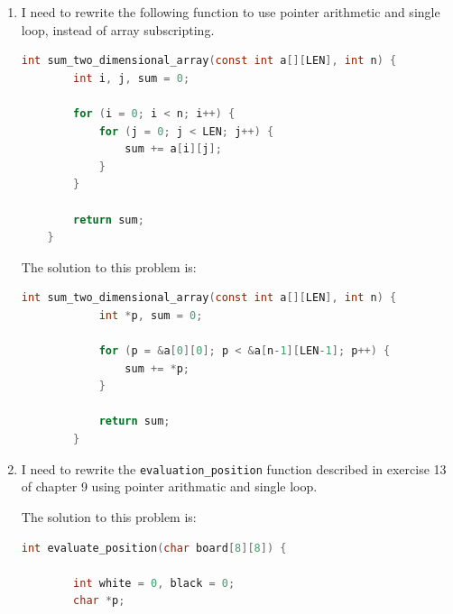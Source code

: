 \documentclass[12pt]{article}
\begin{document}
\begin{enumerate}[1.]
\begin{lstlisting}[language=c]
\end{lstlisting}

    \item

    I need to rewrite the following function to use pointer arithmetic
    and single loop, instead of array subscripting.

    \bigskip

\begin{lstlisting}[language=c]
    int sum_two_dimensional_array(const int a[][LEN], int n) {
        int i, j, sum = 0;

        for (i = 0; i < n; i++) {
            for (j = 0; j < LEN; j++) {
                sum += a[i][j];
            }
        }

        return sum;
    }

\end{lstlisting}

    \bigskip

    The solution to this problem is:

    \bigskip


    \begin{lstlisting}[language=c]
        int sum_two_dimensional_array(const int a[][LEN], int n) {
            int *p, sum = 0;

            for (p = &a[0][0]; p < &a[n-1][LEN-1]; p++) {
                sum += *p;
            }

            return sum;
        }
    \end{lstlisting}

    \item

    I need to rewrite the \texttt{evaluation\_position} function described in
    exercise 13 of chapter 9 using pointer arithmatic and single loop.

    \bigskip

    The solution to this problem is:

\begin{lstlisting}[language=c]
    int evaluate_position(char board[8][8]) {

        int white = 0, black = 0;
        char *p;


\end{lstlisting}
\end{enumerate}
\end{document}
